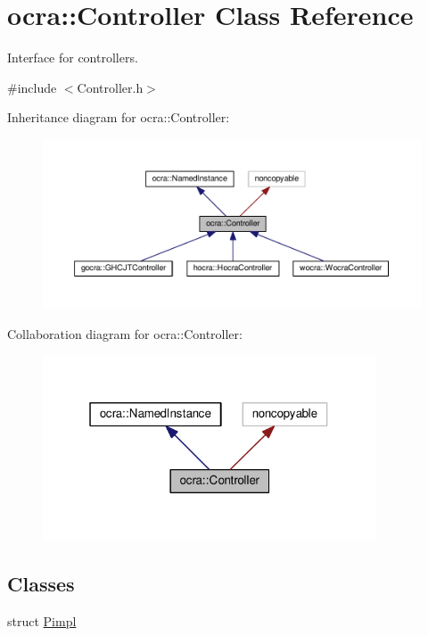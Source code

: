 \hypertarget{classocra_1_1Controller}{}\section{ocra\+:\+:Controller Class Reference}
\label{classocra_1_1Controller}


Interface for controllers.  




{\ttfamily \#include $<$Controller.\+h$>$}



Inheritance diagram for ocra\+:\+:Controller\+:
\nopagebreak
\begin{figure}[H]
\begin{center}
\leavevmode
\includegraphics[width=350pt]{dc/d26/classocra_1_1Controller__inherit__graph}
\end{center}
\end{figure}


Collaboration diagram for ocra\+:\+:Controller\+:
\nopagebreak
\begin{figure}[H]
\begin{center}
\leavevmode
\includegraphics[width=280pt]{dc/dfe/classocra_1_1Controller__coll__graph}
\end{center}
\end{figure}
\subsection*{Classes}
\begin{DoxyCompactItemize}
\item 
struct \hyperlink{structocra_1_1Controller_1_1Pimpl}{Pimpl}
\end{DoxyCompactItemize}
